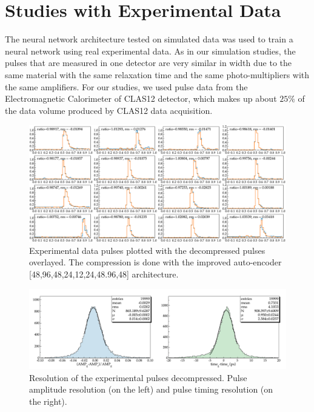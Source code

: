 \section{Studies with Experimental Data}

The neural network architecture tested on simulated data was used to train a neural network using real experimental data. As in our simulation studies, the pulses that are measured in one detector are very similar in width due to the same material with the same relaxation time and the same photo-multipliers with the same amplifiers. For our studies, we used pulse data from the Electromagnetic Calorimeter of CLAS12 detector, which makes up about $25\%$ of the data volume produced by CLAS12 data acquisition. 


\begin{figure}[h!]
\centering
\includegraphics[width=0.95\columnwidth]{results_data_96.pdf}
\caption{Experimental data pulses plotted with the decompressed pulses overlayed. The compression is done with the improved auto-encoder [48,96,48,24,12,24,48.96,48] architecture. } 
\label{fig:results_data_96}
\end{figure}

\begin{figure}[h!]
\centering
\includegraphics[width=0.9\columnwidth]{out_evaluate_csv_raw_96.pdf}
\caption{Resolution of the experimental pulses decompressed. Pulse amplitude resolution (on the left) and pulse timing resolution (on the right). } 
\label{fig:results_data_96_res}
\end{figure}

